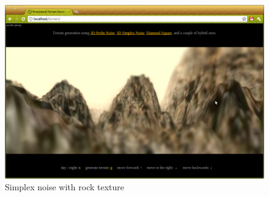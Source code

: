 \begin{figure}
	\center
	\includegraphics[scale=0.4]{demo_3_3.png}
	\caption{Simplex noise with rock texture}
	\label{fig:demo_3_3}
\end{figure}
